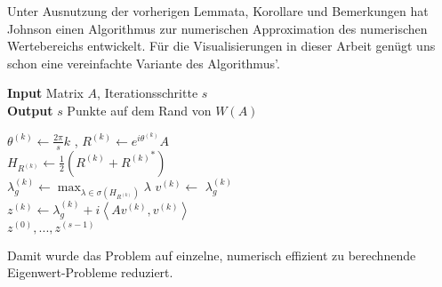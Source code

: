 Unter Ausnutzung der vorherigen Lemmata, Korollare und Bemerkungen hat Johnson einen Algorithmus zur numerischen Approximation des numerischen Wertebereichs entwickelt. Für die Visualisierungen in dieser Arbeit genügt uns schon eine vereinfachte Variante des Algorithmus'.

\begin{algorithm}
	\caption{}\label{euclid}
	\hspace*{\algorithmicindent}\textbf{Input} Matrix $A$, Iterationsschritte $s$\\
	\hspace*{\algorithmicindent}\textbf{Output} $s$ Punkte auf dem Rand von $W(A)$ \\
	
	\begin{algorithmic}[1]
			\State $\theta^{(k)} \gets \frac{2\pi}{s}k$ , $R^{(k)} \gets e^{i\theta^{(k)}}A$ 
			 \\
			\State $H_{R^{(k)}} \gets \frac{1}{2}(R^{(k)}+{R^{(k)}}^*)$ 
			 \\
			\State $\lambda_g^{(k)} \gets \max_{\lambda \in \sigma(H_{R^{(k)}})} \lambda$
			\State $v^{(k)} \gets$  $\lambda_g^{(k)}$ 
			 \\
			\State $z^{(k)} \gets \lambda_g^{(k)} + i \left< Av^{(k)},v^{(k)} \right>$
		\EndFor \\
		\Return $z^{(0)}, ..., z^{(s-1)}$
	\end{algorithmic}
\end{algorithm}

Damit wurde das Problem auf einzelne, numerisch effizient zu berechnende Eigenwert-Probleme reduziert.

